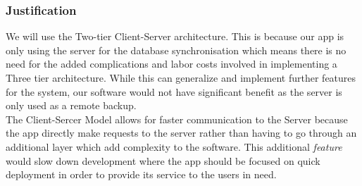 \documentclass[a4paper,11pt]{article} %
\begin{document}
\subsubsection{Justification}
We will use the Two-tier Client-Server architecture. This is because our app is only using
the server for the database synchronisation which means there is no need for the added complications
and labor costs involved in implementing a Three tier architecture. While this can generalize and implement further
features for the system, our software would not have significant benefit as the server is only used as a remote backup.
\\
The Client-Sercer Model allows 
for faster communication to the Server because the app directly make requests to the server rather than having to go through an additional layer which
add complexity to the software. This additional \emph{feature} would slow down development where the app should be focused on quick deployment in order
to provide its service to the users in need.
\end{document}

